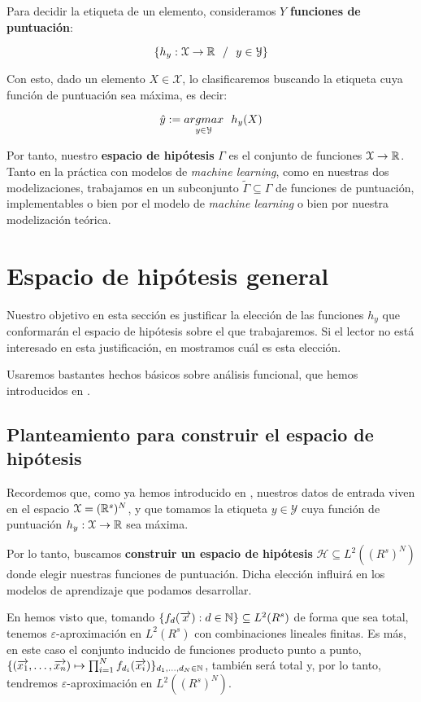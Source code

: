 Para decidir la etiqueta de un elemento, consideramos $Y$ \textbf{funciones de puntuación}:

$$\{h_y: \mathcal{X} \to \mathbb{R} \ \  / \ \  y \in \mathcal{Y} \}$$

Con esto, dado un elemento $X \in \mathcal{X}$, lo clasificaremos buscando la etiqueta cuya función de puntuación sea máxima, es decir:

$$\hat{y} := \underset{y \in \mathcal{Y}}{argmax} \ \  h_y(X)$$

Por tanto, nuestro \textbf{espacio de hipótesis} $\Gamma$ es el conjunto de funciones $\mathcal{X} \to \mathbb{R}$. Tanto en la práctica con modelos de \textit{machine learning}, como en nuestras dos modelizaciones, trabajamos en un subconjunto $\tilde{\Gamma} \subseteq \Gamma$ de funciones de puntuación, implementables o bien por el modelo de \textit{machine learning} o bien por nuestra modelización teórica.

\section{Espacio de hipótesis general}

Nuestro objetivo en esta sección es justificar la elección de las funciones $h_y$ que conformarán el espacio de hipótesis sobre el que trabajaremos. Si el lector no está interesado en esta justificación, en  mostramos cuál es esta elección.

Usaremos bastantes hechos básicos sobre análisis funcional, que hemos introducidos en .

\subsection{Planteamiento para construir el espacio de hipótesis} \label{sec:justificacion_func_repr}

Recordemos que, como ya hemos introducido en , nuestros datos de entrada viven en el espacio $\mathcal{X} = (\mathbb{R}^s)^N$, y que tomamos la etiqueta $y \in \mathcal{Y}$ cuya función de puntuación $h_y: \mathcal{X} \to \mathbb{R}$ sea máxima.

Por lo tanto, buscamos \textbf{construir un espacio de hipótesis} $\mathcal{H} \subseteq L^2((R^s)^N)$ donde elegir nuestras funciones de puntuación. Dicha elección influirá en los modelos de aprendizaje que podamos desarrollar.

En  hemos visto que, tomando $\{f_d(\overrightarrow{x}): d \in \mathbb{N}\} \subseteq L^2(R^s)$ de forma que sea total, tenemos $\varepsilon$-aproximación en $L^2(R^s)$ con combinaciones lineales finitas. Es más, en este caso el conjunto inducido de funciones producto punto a punto, $\{(\overrightarrow{x_1}, \ldots, \overrightarrow{x_n}) \mapsto \prod_{i = 1}^N f_{d_i}(\overrightarrow{x_i}) \}_{d_1, \ldots, d_N \in \mathbb{N}}$, también será total y, por lo tanto, tendremos $\varepsilon$-aproximación en $L^2((R^s)^N)$.

